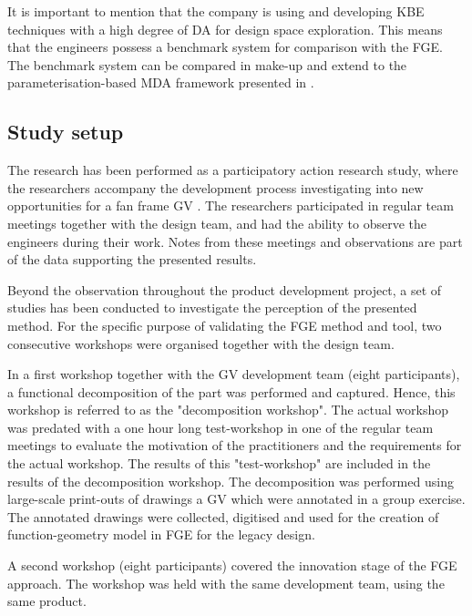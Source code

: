 \documentclass[aerospace,article,submit,moreauthors,pdftex]{Definitions/mdpi}
\begin{document}
It is important to mention that the company is using and developing  \ac{KBE} techniques with a high degree of \ac{DA} for design space exploration.
This means that the engineers possess a benchmark system for comparison with the FGE. 
The benchmark system can be compared in make-up and extend to the parameterisation-based \ac{MDA} framework presented in \cite{Sandberg2017ADesign}.


\subsection{Study setup}
The research has been performed as a participatory action research study, where the researchers accompany the development process investigating into new opportunities for a fan frame \ac{GV} \citep{Yin2006}.
The researchers participated in regular team meetings together with the design team, and had the ability to observe the engineers during their work.
Notes from these meetings and observations are part of the data supporting the presented results.


Beyond the observation throughout the product development project, a set of studies has been conducted to investigate the perception of the presented method.
For the specific  purpose of validating the FGE method and tool, two consecutive workshops were organised together with the design team. 

In a first workshop together with the \ac{GV} development team (eight participants), a functional decomposition of the part was performed and captured.
Hence, this workshop is referred to as the "decomposition workshop".
The actual workshop was predated with a one hour long test-workshop in one of the regular team meetings to evaluate the motivation of the practitioners and the requirements for the actual workshop.
The results of this "test-workshop" are included in the results of the decomposition workshop.
The decomposition was performed using large-scale print-outs of drawings a \ac{GV} which were annotated in a group exercise.
The annotated drawings were collected, digitised and used for the creation of function-geometry model in \ac{FGE} for the legacy design.

A second workshop (eight participants) covered the innovation stage of the \ac{FGE} approach. 
The workshop was held with the same development team, using the same product.%
\end{document}
